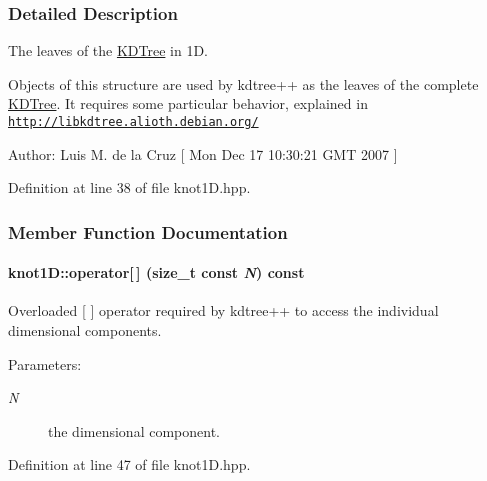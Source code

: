 \subsubsection{Detailed Description}
The leaves of the \hyperlink{namespaceKDTree}{KDTree} in 1D. 

Objects of this structure are used by kdtree++ as the leaves of the complete \hyperlink{namespaceKDTree}{KDTree}. It requires some particular behavior, explained in \href{http://libkdtree.alioth.debian.org/}{\tt http://libkdtree.alioth.debian.org/} \begin{Desc}
\item[Author:]Luis M. de la Cruz \mbox{[} Mon Dec 17 10:30:21 GMT 2007 \mbox{]} \end{Desc}


Definition at line 38 of file knot1D.hpp.

\subsubsection{Member Function Documentation}
\hypertarget{structknot1D_e057579d51678ab186944232b6b0233e}{
\paragraph[{operator[]}]{ knot1D::operator\mbox{[}$\,$\mbox{]} (size\_\-t const  {\em N}) const}\hfill}
\label{structknot1D_e057579d51678ab186944232b6b0233e}


Overloaded \mbox{[} \mbox{]} operator required by kdtree++ to access the individual dimensional components. 

\begin{Desc}
\item[Parameters:]
\begin{description}
\item[{\em N}]the dimensional component. \end{description}
\end{Desc}


Definition at line 47 of file knot1D.hpp.
